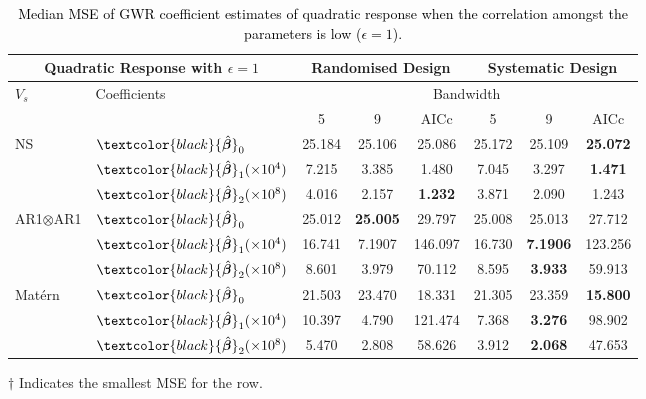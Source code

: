 \documentclass[a4paper]{article} 	%
\newcommand{\Matern}{Mat\'ern }
\newcommand{\zc}[1]{\textcolor{black}{#1}}
\begin{document}
\begin{table}[!htp]
\centering
\begin{threeparttable}
\caption{\zc{Median MSE of GWR coefficient estimates of quadratic response when the correlation amongst the parameters is low ($\epsilon=1$).}}\label{tb:MSEquadratic}
\begin{tabular}{ll|ccc|ccc}
\toprule
\multicolumn{2}{c}{Quadratic Response with $\epsilon=1$} & \multicolumn{3}{c}{Randomised Design} & \multicolumn{3}{c}{Systematic Design} \\ \midrule
\multirow{2}{*}{$V_s$} & \multirow{2}{*}{Coefficients}  & \multicolumn{6}{c}{Bandwidth}\\ 
		  &  & 5  & 9  & AICc & 5  & 9  & AICc \\ \midrule
\multirow{3}{*}{NS}     & $\zc{\hat{\bm{\beta}}}_0$  & 25.184 & 25.106 & 25.086    & 25.172 & 25.109 & \bf{25.072}\tnote{$\dagger$}   \\
   &  $\zc{\hat{\bm{\beta}}}_1 (\times 10^4)$ & 7.215  & 3.385  & 1.480     & 7.045  & 3.297  & \bf{1.471}\tnote{$\dagger$}      \\
   & $\zc{\hat{\bm{\beta}}}_2 (\times 10^8)$ & 4.016  & 2.157  & \bf{1.232}\tnote{$\dagger$}     & 3.871  & 2.090  & 1.243     \\ \midrule
\multirow{3}{*}{AR1$\otimes$AR1} & $\zc{\hat{\bm{\beta}}}_0$  & 25.012     & \bf{25.005}\tnote{$\dagger$}  & 29.797    & 25.008 & 25.013 & 27.712    \\
   &  $\zc{\hat{\bm{\beta}}}_1 (\times 10^4)$  & 16.741 & 7.1907  & 146.097   & 16.730 & \bf{7.1906}\tnote{$\dagger$}   & 123.256   \\
   & $\zc{\hat{\bm{\beta}}}_2 (\times 10^8)$ & 8.601  & 3.979  & 70.112    & 8.595  & \bf{3.933}\tnote{$\dagger$}   & 59.913    \\ \midrule
\multirow{3}{*}{\Matern} & $\zc{\hat{\bm{\beta}}}_0$  & 21.503 & 23.470 & 18.331    & 21.305 & 23.359 & \bf{15.800}\tnote{$\dagger$}      \\
   & $\zc{\hat{\bm{\beta}}}_1 (\times 10^4)$  & 10.397 & 4.790  & 121.474   & 7.368  & \bf{3.276}\tnote{$\dagger$}    & 98.902    \\
   & $\zc{\hat{\bm{\beta}}}_2 (\times 10^8)$ & 5.470  & 2.808  & 58.626    & 3.912  & \bf{2.068}\tnote{$\dagger$}   & 47.653    \\ 
   \bottomrule
\end{tabular}
\begin{tablenotes}
\item[$\dagger$] \footnotesize Indicates the smallest MSE for the row.
\end{tablenotes}
\end{threeparttable}
\end{table}
\end{document}
